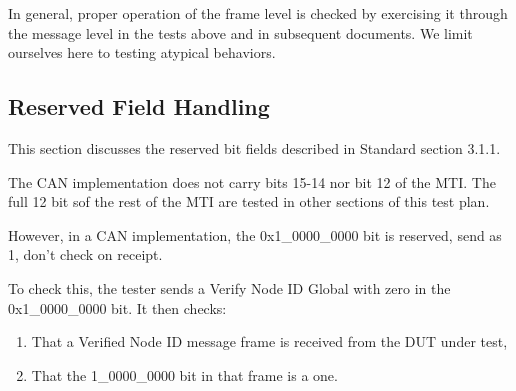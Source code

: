 \documentclass[11pt]{article}
\begin{document}
In general, proper operation of the frame level is checked by 
exercising it through the message level in the tests above and in subsequent 
documents.  We limit ourselves here to testing atypical behaviors.

\subsection{Reserved Field Handling}

This section discusses the reserved bit fields described in Standard section 3.1.1.

The CAN implementation does not carry bits 15-14 nor bit 12 of the MTI. 
The full 12 bit sof the rest of the MTI are tested in other sections of this test plan.

However, in a CAN implementation, the 0x1\_0000\_0000 bit is reserved, send as 1, 
don't check on receipt.

To check this, the tester sends a Verify Node ID Global with zero in the 0x1\_0000\_0000
bit. It then checks:

\begin{enumerate}
\item That a Verified Node ID message frame is received from the DUT under test,
\item That the 1\_0000\_0000 bit in that frame is a one.
\end{enumerate}
\end{document}
